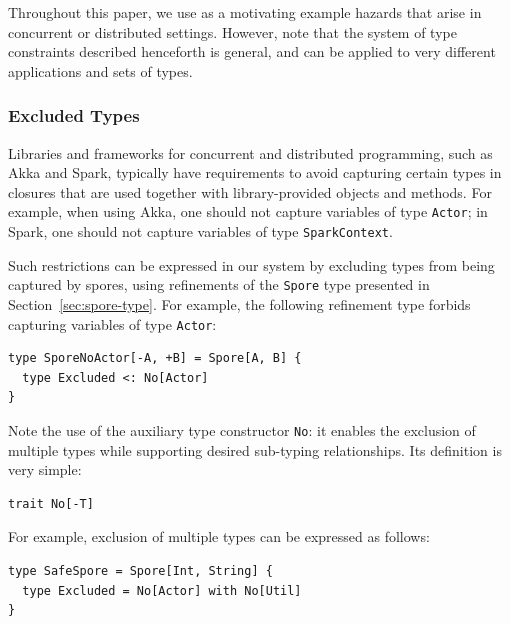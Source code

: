 \documentclass{llncs}
\begin{document}

Throughout this paper, we use as a motivating example hazards that arise in
concurrent or distributed settings. However, note that the system of type
constraints described henceforth is general, and can be applied to very
different applications and sets of types.

\subsubsection{Excluded Types}
\label{sec:excluded-types}

Libraries and frameworks for concurrent and distributed programming, such as
Akka and Spark, typically have requirements to avoid capturing certain types
in closures that are used together with library-provided objects and methods.
For example, when using Akka, one should not capture variables of type
\verb|Actor|; in Spark, one should not capture variables of type
\verb|SparkContext|.

Such restrictions can be expressed in our system by excluding types from being
captured by spores, using refinements of the \verb|Spore| type presented in
Section~\ref{sec:spore-type}. For example, the following refinement type
forbids capturing variables of type \verb|Actor|:

\begin{lstlisting}
type SporeNoActor[-A, +B] = Spore[A, B] {
  type Excluded <: No[Actor]
}
\end{lstlisting}
\noindent
Note the use of the auxiliary type constructor \verb|No|: it enables the exclusion of multiple types while supporting desired sub-typing relationships. Its definition is very simple:

\begin{lstlisting}[numbers=none]
trait No[-T]
\end{lstlisting}
\noindent


\noindent For example, exclusion of multiple types can be expressed as follows:

\begin{lstlisting}
type SafeSpore = Spore[Int, String] {
  type Excluded = No[Actor] with No[Util]
}
\end{lstlisting}
\end{document}
